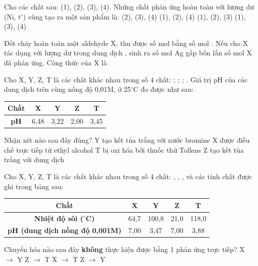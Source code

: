 \documentclass[12pt,a4paper]{article}
\begin{document}
\begin{ex}
Cho các chất sau:  (1),  (2),  (3),  (4). Những chất phản ứng hoàn toàn với lượng dư  (Ni, $t^\circ$) cùng tạo ra một sản phẩm là:
\choice
{(2), (3), (4)}
{(1), (2), (4)}
{(1), (2), (3)}
{(1), (3), (4)}
\end{ex}

\begin{ex}
Đốt cháy hoàn toàn một aldehyde X, thu được số mol  bằng số mol . Nếu cho X tác dụng với lượng dư  trong dung dịch , sinh ra số mol Ag gấp bốn lần số mol X đã phản ứng. Công thức của X là
\choice
{}
{}
{}
{}
\end{ex}

\begin{ex}
Cho X, Y, Z, T là các chất khác nhau trong số 4 chất: ; ; ; . Giá trị pH của các dung dịch trên cùng nồng độ 0,01M, ở 25$^\circ$C đo được như sau:
\begin{center}
\begin{tabular}{|c|c|c|c|c|}
\hline
\textbf{Chất} & X & Y & Z & T \\ \hline
\textbf{pH} & 6,48 & 3,22 & 2,00 & 3,45 \\ \hline
\end{tabular}
\end{center}
Nhận xét nào sau đây đúng?
\choice
{Y tạo kết tủa trắng với nước bromine}
{X được điều chế trực tiếp từ ethyl alcohol}
{T bị oxi hóa bởi thuốc thử Tollens}
{Z tạo kết tủa trắng với dung dịch }
\end{ex}

\begin{ex}
Cho X, Y, Z, T là các chất khác nhau trong số 4 chất: , , ,  và các tính chất được ghi trong bảng sau:
\begin{center}
\begin{tabular}{|c|c|c|c|c|}
\hline
\textbf{Chất} & X & Y & Z & T \\ \hline
\textbf{Nhiệt độ sôi ($^\circ$C)} & 64,7 & 100,8 & 21,0 & 118,0 \\ \hline
\textbf{pH (dung dịch nồng độ 0,001M)} & 7,00 & 3,47 & 7,00 & 3,88 \\ \hline
\end{tabular}
\end{center}
Chuyển hóa nào sau đây \textbf{không} thực hiện được bằng 1 phản ứng trực tiếp?
\choice
{X $\rightarrow$ Y}
{Z $\rightarrow$ T}
{X $\rightarrow$ T}
{Z $\rightarrow$ Y}
\end{ex}
\end{document}
